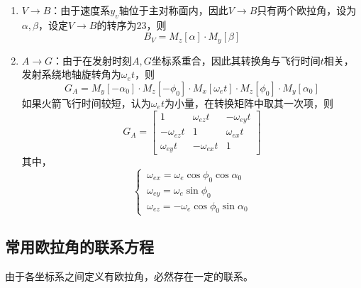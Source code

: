 \begin{enumerate}
	
	\item $V \to B$：由于速度系$y_v$轴位于主对称面内，因此$V \to B$只有两个欧拉角，设为$\alpha,\beta$，设定$V \to B$的转序为23，则
	\begin{equation}
		B_V = M_z[\alpha] \cdot M_y [\beta]
	\end{equation}
	
	\hspace*{1em}
	
	
	\item $A \to G$：由于在发射时刻$A,G$坐标系重合，因此其转换角与飞行时间$t$相关，发射系绕地轴旋转角为$\omega_e t$，则
	\begin{equation}
		G_A = M_y[-\alpha_0] \cdot M_z[-\phi_0] \cdot M_x[\omega_e t] \cdot M_z[\phi_0] \cdot M_y[\alpha_0]
	\end{equation}
	如果火箭飞行时间较短，认为$\omega_e t$为小量，在转换矩阵中取其一次项，则
	\begin{equation}
		G_A = 
		\begin{bmatrix}
			1 & \omega_{ez}t & -\omega_{ey} t\\
			-\omega_{ez}t & 1 &\omega_{ex} t \\
			\omega_{ey} t & -\omega_{ex}t & 1 
		\end{bmatrix}
	\end{equation}
	其中，
	\begin{equation}
		\begin{cases}
			\,\omega_{ex} = \omega_e \cos \phi_0 \cos \alpha_0 \\
			\,\omega_{ey} = \omega_e \sin \phi_0\\
			\,\omega_{ez} = - \omega_e \cos \phi_0 \sin \alpha_0
		\end{cases}
	\end{equation}
\end{enumerate}

\subsection{常用欧拉角的联系方程}
由于各坐标系之间定义有欧拉角，必然存在一定的联系。

